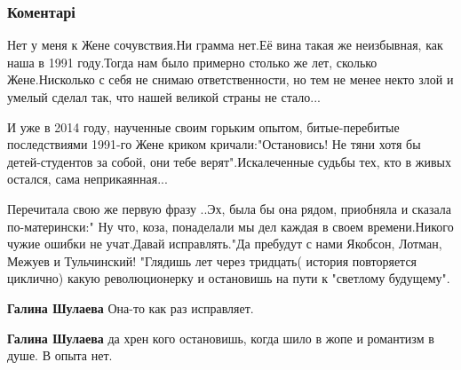 
 
 
 
 
\subsubsection{Коментарі}

\begin{itemize} %

Нет у меня к Жене сочувствия.Ни грамма нет.Её вина такая же неизбывная, как
наша в 1991 году.Тогда нам было примерно столько же лет, сколько Жене.Нисколько
с себя не снимаю ответственности, но тем не менее некто злой и умелый сделал
так, что нашей великой страны не стало...

И уже в 2014 году, наученные своим горьким опытом, битые-перебитые
последствиями 1991-го Жене криком кричали:"Остановись! Не тяни хотя бы
детей-студентов за собой, они тебе верят".Искалеченные судьбы тех, кто в живых
остался, сама неприкаянная...

Перечитала свою же первую фразу ..Эх, была бы она рядом, приобняла и сказала
по-матерински:" Ну что, коза, понаделали мы дел каждая в своем времени.Никого
чужие ошибки не учат.Давай исправлять."Да пребудут с нами Якобсон, Лотман,
Межуев и Тульчинский! "Глядишь лет через тридцать( история повторяется
циклично) какую революционерку и остановишь на пути к "светлому будущему".

\begin{itemize} %
\textbf{Галина Шулаева} Она-то как раз исправляет.

\textbf{Галина Шулаева} да хрен кого остановишь, когда шило в жопе и романтизм в душе. В опыта нет.
\end{itemize} %

\end{itemize} %

